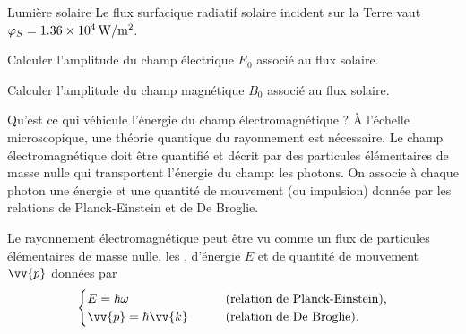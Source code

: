 \documentclass[12pt,fancy]{cours}
\begin{document}
\begin{exemple}{Lumière solaire}
  Le flux surfacique radiatif solaire incident sur la Terre vaut $\varphi_S = \SI{1.36e4}{W/m^2}$. 
  \begin{quest}
    \item	Calculer l'amplitude du champ électrique $E_0$ associé au flux solaire.
    \item Calculer l'amplitude du champ magnétique $B_0$ associé au flux solaire.
  \end{quest}
\end{exemple}

Qu'est ce qui véhicule l'énergie du champ électromagnétique ? À l'échelle microscopique, une théorie quantique du rayonnement est nécessaire. Le champ électromagnétique doit être quantifié et décrit par des particules élémentaires de masse nulle qui transportent l'énergie du champ: les photons. On associe à chaque photon une énergie et une quantité de mouvement (ou impulsion) donnée par les relations de Planck-Einstein et de De Broglie.

\begin{theorem}
  Le rayonnement électromagnétique peut être vu comme un flux de particules élémentaires de masse nulle, les , d'énergie $E$ et de quantité de mouvement $\vv{p}$ données par 
  $$\begin{cases}
    E=\hbar\omega\qquad&\text{(relation de Planck-Einstein),}\\
    \vv{p}=\hbar\vv{k}\qquad&\text{(relation de De Broglie).}
  \end{cases}$$
\end{theorem}
\end{document}
